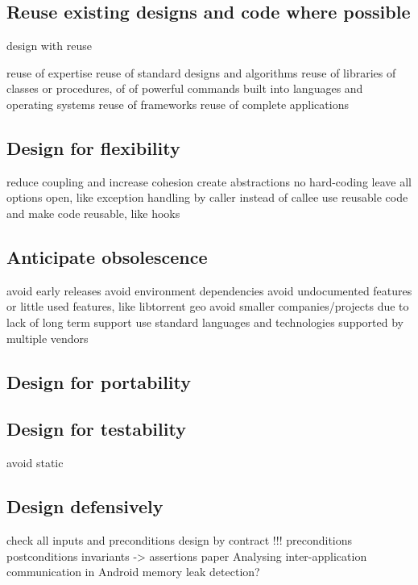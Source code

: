 \subsection{Reuse existing designs and code where possible}

design with reuse

reuse of expertise
reuse of standard designs and algorithms
reuse of libraries of classes or procedures, of of powerful commands built into languages and operating systems
reuse of frameworks
reuse of complete applications

\subsection{Design for flexibility} %

reduce coupling and increase cohesion
create abstractions
no hard-coding
leave all options open, like exception handling by caller instead of callee
use reusable code and make code reusable, like hooks

\subsection{Anticipate obsolescence}

avoid early releases
avoid environment dependencies
avoid undocumented features or little used features, like libtorrent geo
avoid smaller companies/projects due to lack of long term support
use standard languages and technologies supported by multiple vendors

\subsection{Design for portability}

\subsection{Design for testability}

avoid static

\subsection{Design defensively}

check all inputs and preconditions
design by contract !!!
preconditions
postconditions
invariants
-> assertions
paper Analysing inter-application communication in Android
memory leak detection?


